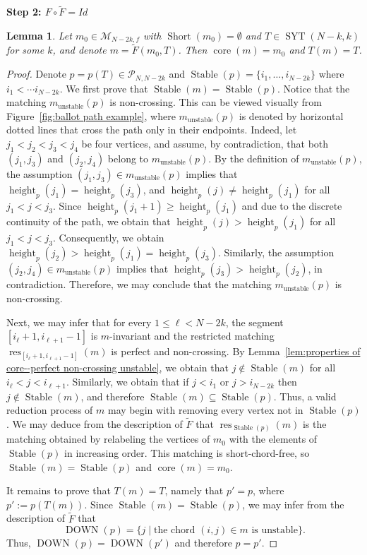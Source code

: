 \documentclass[11pt]{article}
\makeatletter
\newtheorem{lemma}[theo]{Lemma}
\theoremstyle{definition}
\numberwithin{equation}{section}
\newcommand{\Syt}{\operatorname{SYT}}
\newcommand{\Short}{\operatorname{Short}}
\newcommand{\Stable}{\operatorname{Stable}}
\newcommand{\height}{\operatorname{height}}
\newcommand{\core}{\operatorname{core}}
\newcommand{\res}{\operatorname{res}}
\newcommand{\DOWN}{\operatorname{DOWN}}
\newcommand{\M}{\mathcal{M}}
\newcommand{\Pcal}{\mathcal{P}}
\newcommand{\proofstep}[1]{
  \par
  \addvspace{\medskipamount}
  \textbf{#1\@addpunct{.}}\enspace\ignorespaces
}
\makeatother
\begin{document}
\proofstep{Step 2: $F \circ \tilde{F} = Id$}
\begin{lemma}
\label{lem:F(F_tilde)=id}
    Let $m_0 \in \M_{N-2k,f}$ with $\Short(m_0) = \emptyset$ and $T \in \Syt(N-k,k)$ for some $k$, and denote $m = \tilde{F}(m_0,T)$. Then $\core(m)=m_0$ and $T(m) = T$.
\end{lemma}
\begin{proof}
    Denote $p=p(T) \in \Pcal_{N,N-2k}$ and $\Stable(p) = \{i_1, \dots, i_{N-2k}\}$ where $i_1 < \cdots i_{N-2k}$. We first prove that $\Stable(m) = \Stable(p)$. Notice that the matching $m_{\text{unstable}}(p)$ is non-crossing. This can be viewed visually from Figure~\ref{fig:ballot path example}, where $m_{\text{unstable}}(p)$ is denoted by horizontal dotted lines that cross the path only in their endpoints. Indeed, let $j_1 < j_2 < j_3 < j_4$ be four vertices, and assume, by contradiction, that both $(j_1,j_3)$ and $(j_2,j_4)$ belong to $m_{\text{unstable}}(p)$. By the definition of $m_{\text{unstable}}(p)$, the assumption $(j_1,j_3) \in m_{\text{unstable}}(p)$ implies that $\height_p(j_1) = \height_p(j_3)$, and $\height_p(j) \ne \height_p(j_1)$ for all $j_1 < j < j_3$. Since $\height_p(j_1+1) \ge \height_p(j_1)$ and due to the discrete continuity of the path, we obtain that $\height_p(j) > \height_p(j_1)$ for all $j_1 < j < j_3$. Consequently, we obtain $\height_p(j_2) > \height_p(j_1) = \height_p(j_3)$. Similarly, the assumption $(j_2,j_4) \in m_{\text{unstable}}(p)$ implies that $\height_p(j_3) > \height_p(j_2)$, in contradiction. Therefore, we may conclude that the matching $m_{\text{unstable}}(p)$ is non-crossing.
    
    Next, we may infer that for every $1 \le \ell < N-2k$, the segment $[i_\ell+1,i_{\ell+1}-1]$ is $m$-invariant and the restricted matching $\res_{[i_\ell+1,i_{\ell+1}-1]}(m)$ is perfect and non-crossing. By Lemma~\ref{lem:properties of core--perfect non-crossing unstable}, we obtain that $j \notin \Stable(m)$ for all $i_\ell < j < i_{\ell+1}$. Similarly, we obtain that if $j < i_1$ or $j > i_{N-2k}$ then $j \notin \Stable(m)$, and therefore $\Stable(m) \subseteq \Stable(p)$. Thus, a valid reduction process of $m$ may begin with removing every vertex not in $\Stable(p)$. We may deduce from the description of $\tilde{F}$ that $\res_{\Stable(p)}(m)$ is the matching obtained by relabeling the vertices of $m_0$ with the elements of $\Stable(p)$ in increasing order. This matching is short-chord-free, so $\Stable(m) = \Stable(p)$ and $\core(m) = m_0$.

    It remains to prove that $T(m) = T$, namely that $p' = p$, where $p' := p(T(m))$. Since $\Stable(m) = \Stable(p)$, we may infer from the description of $\tilde{F}$ that
    \[
        \DOWN(p) = \{j \mid \text{the chord } (i,j) \in m \text{ is unstable}\}.
    \]
    Thus, $\DOWN(p) = \DOWN(p')$ and therefore $p = p'$.
\end{proof}
\end{document}
